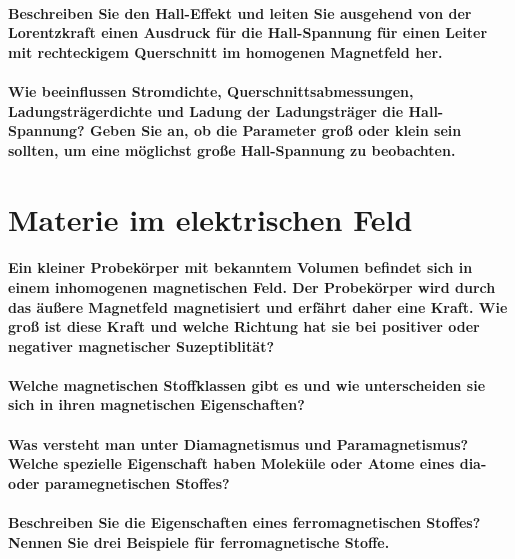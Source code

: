 \documentclass[a4paper, 11pt, parskip=half]{scrartcl}
\begin{document}
\paragraph{Beschreiben Sie den Hall-Effekt und leiten Sie ausgehend von der Lorentzkraft einen
Ausdruck für die Hall-Spannung für einen Leiter mit rechteckigem Querschnitt im homogenen Magnetfeld
her.}

\paragraph{Wie beeinflussen Stromdichte, Querschnittsabmessungen, Ladungsträgerdichte und Ladung
der Ladungsträger die Hall-Spannung? Geben Sie an, ob die Parameter groß oder klein sein sollten, um
eine möglichst große Hall-Spannung zu beobachten.}

\newpage

\section{Materie im elektrischen Feld}

\paragraph{Ein kleiner Probekörper mit bekanntem Volumen befindet sich in einem inhomogenen
magnetischen Feld. Der Probekörper wird durch das äußere Magnetfeld magnetisiert und erfährt daher
eine Kraft. Wie groß ist diese Kraft und welche Richtung hat sie bei positiver oder negativer
magnetischer Suzeptiblität?}

\paragraph{Welche magnetischen Stoffklassen gibt es und wie unterscheiden sie sich in ihren
magnetischen Eigenschaften?}

\paragraph{Was versteht man unter Diamagnetismus und Paramagnetismus? Welche spezielle Eigenschaft
haben Moleküle oder Atome eines dia- oder paramegnetischen Stoffes?}

\paragraph{Beschreiben Sie die Eigenschaften eines ferromagnetischen Stoffes? Nennen Sie drei
Beispiele für ferromagnetische Stoffe.}
\end{document}
